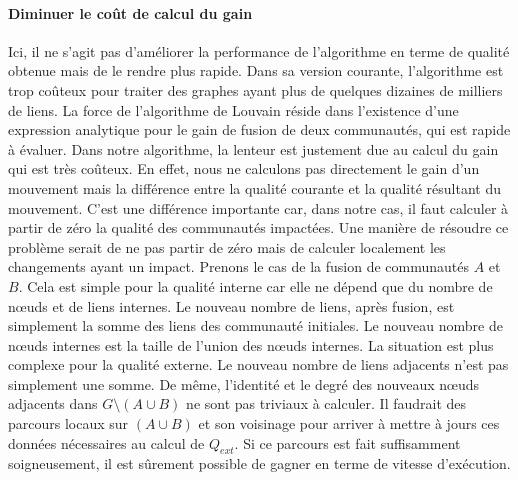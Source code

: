 \paragraph{Diminuer le coût de calcul du gain}
Ici, il ne s'agit pas d'améliorer la performance de l'algorithme en terme de qualité obtenue mais de le rendre plus rapide.
Dans sa version courante, l'algorithme est trop coûteux pour traiter des graphes ayant plus de quelques dizaines de milliers de liens.
La force de l'algorithme de Louvain réside dans l'existence d'une expression analytique pour le gain de fusion de deux communautés, qui est rapide à évaluer.
Dans notre algorithme, la lenteur est justement due au calcul du gain qui est très coûteux.
En effet, nous ne calculons pas directement le gain d'un mouvement mais la différence entre la qualité courante et la qualité résultant du mouvement.
C'est une différence importante car, dans notre cas, il faut calculer à partir de zéro la qualité des communautés impactées.
Une manière de résoudre ce problème serait de ne pas partir de zéro mais de calculer localement les changements ayant un impact.
Prenons le cas de la fusion de communautés $A$ et $B$.
Cela est simple pour la qualité interne car elle ne dépend que du nombre de n\oe uds et de liens internes.
Le nouveau nombre de liens, après fusion, est simplement la somme des liens des communauté initiales.
Le nouveau nombre de n\oe uds internes est la taille de l'union des n\oe uds internes.
La situation est plus complexe pour la qualité externe.
Le nouveau nombre de liens adjacents n'est pas simplement une somme.
De même, l'identité et le degré des nouveaux n\oe uds adjacents dans $G \setminus (A \cup B)$ ne sont pas triviaux à calculer.
Il faudrait des parcours locaux sur $(A \cup B)$ et son voisinage pour arriver à mettre à jours ces données nécessaires au calcul de $Q_{ext}$. 
Si ce parcours est fait suffisamment soigneusement, il est sûrement possible de gagner en terme de vitesse d'exécution.


